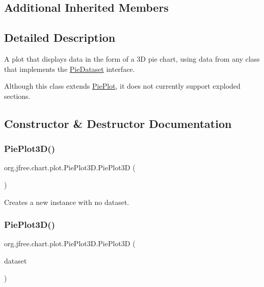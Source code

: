 \subsection*{Additional Inherited Members}


\subsection{Detailed Description}
A plot that displays data in the form of a 3D pie chart, using data from any class that implements the \mbox{\hyperlink{}{Pie\+Dataset}} interface. 

Although this class extends \mbox{\hyperlink{classorg_1_1jfree_1_1chart_1_1plot_1_1_pie_plot}{Pie\+Plot}}, it does not currently support exploded sections. 

\subsection{Constructor \& Destructor Documentation}
\mbox{\label{classorg_1_1jfree_1_1chart_1_1plot_1_1_pie_plot3_d_aa7e41b53624e2b5a4f778b30ba8f5bcd}} 
\subsubsection{\texorpdfstring{Pie\+Plot3\+D()}{PiePlot3D()}\hspace{0.1cm}{\footnotesize\ttfamily [1/2]}}
{\footnotesize\ttfamily org.\+jfree.\+chart.\+plot.\+Pie\+Plot3\+D.\+Pie\+Plot3D (\begin{DoxyParamCaption}{ }\end{DoxyParamCaption})}

Creates a new instance with no dataset. \mbox{\label{classorg_1_1jfree_1_1chart_1_1plot_1_1_pie_plot3_d_a1654d06e2203edc768388b1b5e36654b}} 
\subsubsection{\texorpdfstring{Pie\+Plot3\+D()}{PiePlot3D()}\hspace{0.1cm}{\footnotesize\ttfamily [2/2]}}
{\footnotesize\ttfamily org.\+jfree.\+chart.\+plot.\+Pie\+Plot3\+D.\+Pie\+Plot3D (\begin{DoxyParamCaption}\item[{\mbox{\hyperlink{interfaceorg_1_1jfree_1_1data_1_1general_1_1_pie_dataset}{Pie\+Dataset}}}]{dataset }\end{DoxyParamCaption})}

